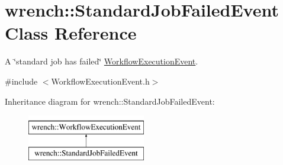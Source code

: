 \hypertarget{classwrench_1_1_standard_job_failed_event}{}\section{wrench\+:\+:Standard\+Job\+Failed\+Event Class Reference}
\label{classwrench_1_1_standard_job_failed_event}


A \char`\"{}standard job has failed\char`\"{} \hyperlink{classwrench_1_1_workflow_execution_event}{Workflow\+Execution\+Event}.  




{\ttfamily \#include $<$Workflow\+Execution\+Event.\+h$>$}

Inheritance diagram for wrench\+:\+:Standard\+Job\+Failed\+Event\+:\begin{figure}[H]
\begin{center}
\leavevmode
\includegraphics[height=2.000000cm]{classwrench_1_1_standard_job_failed_event}
\end{center}
\end{figure}
